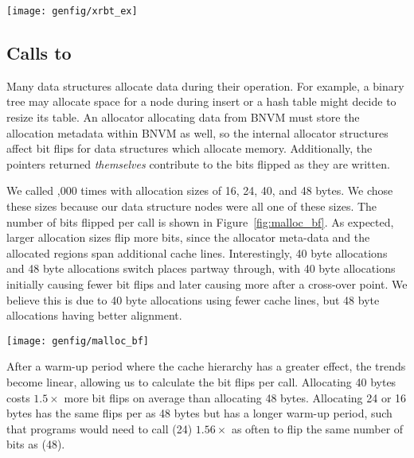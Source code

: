 \begin{SCfigure}
	\centering
	\texttt{[image: genfig/xrbt\_ex]}
	\caption{A typical result of running a test program with increasing
		values of \texttt{iteration\_count}.}
	\label{fig:xrbt_ex}
\end{SCfigure}


\subsection{Calls to \malloc}
\label{sec:exp_malloc}

Many data structures allocate data during their operation. For example, a binary
tree may allocate space for a node during insert or a hash table might decide
to resize its table. An allocator allocating data from BNVM must store the
allocation metadata within BNVM as well, so the internal allocator structures
affect bit flips for data structures which allocate memory. Additionally, the
pointers returned \textit{themselves} contribute to the bits flipped as they are
written.

We called ,000 times with allocation sizes of 16, 24, 40, and 48
bytes. We chose these sizes because our data structure nodes were all
one of these sizes. The number of bits flipped per \malloc call is shown
in Figure~\ref{fig:malloc_bf}. As expected, larger allocation sizes flip more
bits, since the allocator meta-data and the allocated regions span additional
cache lines. Interestingly, 40 byte allocations and 48 byte allocations switch
places partway through, with 40 byte allocations initially causing fewer bit
flips and later causing more after a cross-over point. We believe this is due
to 40 byte allocations using fewer cache lines, but 48 byte allocations having
better alignment.

\begin{SCfigure}
	\centering
	\texttt{[image: genfig/malloc\_bf]}
	\caption{Bit flips due to calls to \malloc. Allocation size of 16 bytes is not
		shown because it matches with 24 bytes.}
	\label{fig:malloc_bf}
\end{SCfigure}


After a warm-up period where the cache hierarchy has a greater effect, the
trends become linear, allowing us to calculate the bit flips per \malloc call.
Allocating 40 bytes costs $1.5\times$ more bit flips on average than allocating
48 bytes. Allocating 24 or 16 bytes has the same flips per \malloc as 48 bytes
but has a longer warm-up period, such that programs would need to call \malloc(24)
$1.56\times$ as often to flip the same number of bits as \malloc(48).

